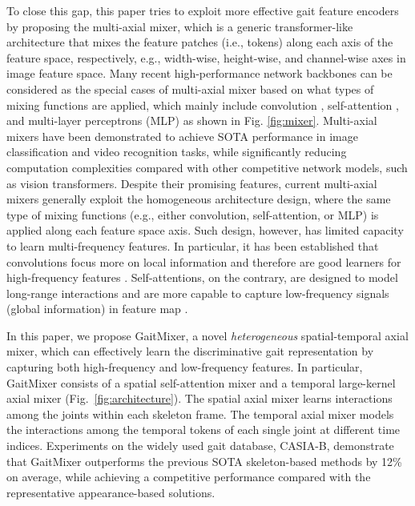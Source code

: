 \documentclass{article}
\begin{document}
To close this gap, this paper tries to exploit more effective gait feature encoders by proposing the multi-axial mixer, which is a generic transformer-like architecture that mixes the feature patches (i.e., tokens) along each axis of the feature space, respectively, e.g., width-wise, height-wise, and channel-wise axes in image feature space. Many recent high-performance network backbones can be considered as the special cases of multi-axial mixer based on what types of mixing functions are applied, which mainly include convolution \cite{GaitGraph}\cite{st-gcn}\cite{ResGCN}, self-attention \cite{st-tr}\cite{PoseFormer}, and multi-layer perceptrons (MLP) \cite{mlp-mixer} \cite{MorphMLP} as shown in Fig. \ref{fig:mixer}. Multi-axial mixers have been demonstrated to achieve SOTA performance in image classification and video recognition tasks, while significantly reducing computation complexities compared with other competitive network models, such as vision transformers. Despite their promising features, current multi-axial mixers generally exploit the homogeneous architecture design, where the same type of mixing functions (e.g., either convolution, self-attention, or MLP) is applied along each feature space axis. Such design, however, has limited capacity to learn multi-frequency features. In particular, it has been established that convolutions focus more on local information and therefore are good learners for high-frequency features \cite{ScaleUp31x31}.  Self-attentions, on the contrary, are designed to model long-range interactions and are more capable to capture low-frequency signals (global information) in feature map \cite{HiLoAttention}. 










In this paper, we propose GaitMixer, a novel \emph{heterogeneous} spatial-temporal axial mixer, which can effectively learn the discriminative gait representation by capturing both high-frequency and low-frequency features.  In particular, GaitMixer consists of a spatial self-attention mixer and a temporal large-kernel axial mixer (Fig.~\ref{fig:architecture}). The spatial axial mixer learns interactions among the joints within each skeleton frame. The temporal axial mixer models the interactions among the temporal tokens of each single joint at different time indices. Experiments on the widely used gait database, CASIA-B, demonstrate that GaitMixer 
outperforms the previous SOTA skeleton-based \cite{GaitGraph} methods by 12\% on average, while achieving a competitive performance compared with the representative appearance-based solutions. 
\end{document}
